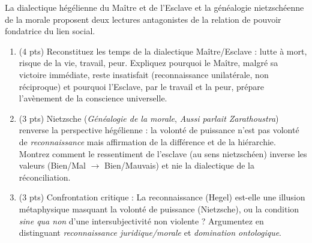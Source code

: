 \documentclass[11pt]{article}
\begin{document}
\begin{exercice}
La dialectique hégélienne du Maître et de l'Esclave et la généalogie nietzschéenne de la morale proposent deux lectures antagonistes de la relation de pouvoir fondatrice du lien social.
\begin{enumerate}
    \item (4 pts) Reconstituez les temps de la dialectique Maître/Esclave : lutte à mort, risque de la vie, travail, peur. Expliquez pourquoi le Maître, malgré sa victoire immédiate, reste \og insatisfait \fg (reconnaissance unilatérale, non réciproque) et pourquoi l'Esclave, par le travail et la peur, prépare l'avènement de la conscience universelle.
    \item (3 pts) Nietzsche (\textit{Généalogie de la morale}, \textit{Aussi parlait Zarathoustra}) renverse la perspective hégélienne : la \og volonté de puissance \fg n'est pas volonté de \textit{reconnaissance} mais affirmation de la différence et de la hiérarchie. Montrez comment le \og ressentiment \fg de l'esclave (au sens nietzschéen) inverse les valeurs (Bien/Mal $\to$ Bien/Mauvais) et nie la dialectique de la réconciliation.
    \item (3 pts) Confrontation critique : La \og reconnaissance \fg (Hegel) est-elle une illusion métaphysique masquant la \og volonté de puissance \fg (Nietzsche), ou la condition \textit{sine qua non} d'une intersubjectivité non violente ? Argumentez en distinguant \textit{reconnaissance juridique/morale} et \textit{domination ontologique}.
\end{enumerate}
\end{exercice}
\end{document}
